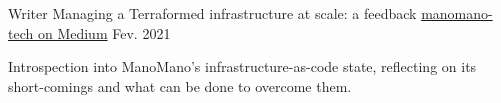 

\begin{cventries}

  \cventry
    {Writer} %
    {Managing a Terraformed infrastructure at scale: a feedback} %
    {\href{https://medium.com/manomano-tech/managing-a-terraformed-infrastructure-at-scale-a-feedback-43e4675e5769}{manomano-tech on Medium}} %
    {Fev. 2021} %
    {
      \begin{cvitems} %
        \item {Introspection into ManoMano's infrastructure-as-code state, reflecting on its short-comings and what can be done to overcome them.}
      \end{cvitems}
    }

\end{cventries}
